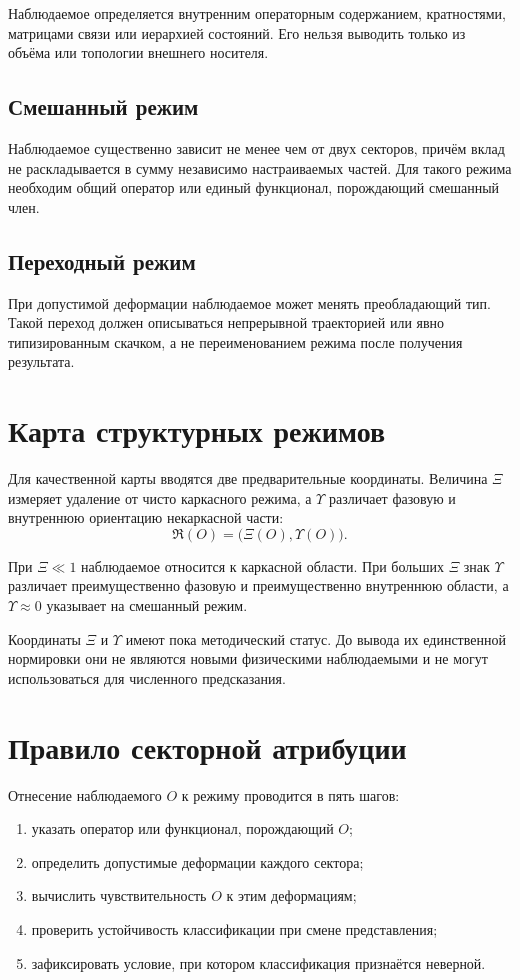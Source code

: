 Наблюдаемое определяется внутренним операторным содержанием, кратностями,
матрицами связи или иерархией состояний. Его нельзя выводить только из объёма
или топологии внешнего носителя.

\section{Смешанный режим}

Наблюдаемое существенно зависит не менее чем от двух секторов, причём вклад
не раскладывается в сумму независимо настраиваемых частей. Для такого режима
необходим общий оператор или единый функционал, порождающий смешанный член.

\section{Переходный режим}

При допустимой деформации наблюдаемое может менять преобладающий тип. Такой
переход должен описываться непрерывной траекторией или явно типизированным
скачком, а не переименованием режима после получения результата.

\chapter{Карта структурных режимов}

Для качественной карты вводятся две предварительные координаты. Величина
$\Xi$ измеряет удаление от чисто каркасного режима, а $\Upsilon$ различает
фазовую и внутреннюю ориентацию некаркасной части:
\begin{equation}
 \mathfrak R(O)=\bigl(\Xi(O),\Upsilon(O)\bigr).
\end{equation}

При $\Xi\ll1$ наблюдаемое относится к каркасной области. При больших
$\Xi$ знак $\Upsilon$ различает преимущественно фазовую и преимущественно
внутреннюю области, а $\Upsilon\approx0$ указывает на смешанный режим.

Координаты $\Xi$ и $\Upsilon$ имеют пока методический статус. До вывода их
единственной нормировки они не являются новыми физическими наблюдаемыми и не
могут использоваться для численного предсказания.

\chapter{Правило секторной атрибуции}

Отнесение наблюдаемого $O$ к режиму проводится в пять шагов:
\begin{enumerate}
 \item указать оператор или функционал, порождающий $O$;
 \item определить допустимые деформации каждого сектора;
 \item вычислить чувствительность $O$ к этим деформациям;
 \item проверить устойчивость классификации при смене представления;
 \item зафиксировать условие, при котором классификация признаётся неверной.
\end{enumerate}

